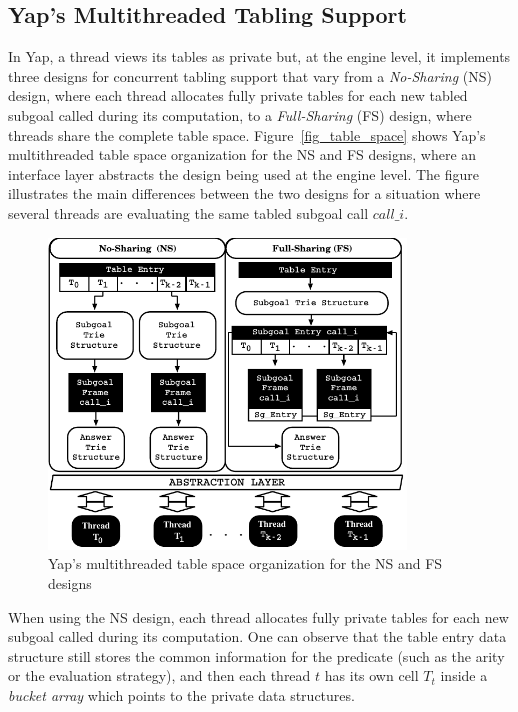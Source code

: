 \documentclass{llncs}
\begin{document}

\subsection{Yap's Multithreaded Tabling Support}

In Yap, a thread views its tables as private but, at the engine level,
it implements three designs for concurrent tabling support that vary
from a \emph{No-Sharing} (NS) design, where each thread allocates
fully private tables for each new tabled subgoal called during its
computation, to a \emph{Full-Sharing} (FS) design, where threads share
the complete table space. Figure~\ref{fig_table_space} shows Yap's
multithreaded table space organization for the NS and FS designs,
where an interface layer abstracts the design being used at the engine
level. The figure illustrates the main differences between the two
designs for a situation where several threads are evaluating the same
tabled subgoal call $call\_i$.

\begin{figure}[!ht]
\centering
\includegraphics[width=9.5cm]{figures/yap-mt.pdf}
\caption{Yap's multithreaded table space organization for the NS and FS designs}
\label{fig_yap_mt_support}
\end{figure}

When using the NS design, each thread allocates fully private tables
for each new subgoal called during its computation. One can observe
that the table entry data structure still stores the common
information for the predicate (such as the arity or the evaluation
strategy), and then each thread $t$ has its own cell $T_t$ inside a
\emph{bucket array} which points to the private data structures.
\end{document}
